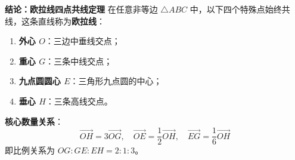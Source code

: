 \begin{statementbox}
\textbf{结论：欧拉线四点共线定理}
在任意非等边 $\triangle ABC$ 中，以下四个特殊点始终共线，这条直线称为\textbf{欧拉线}：
\begin{enumerate}
    \item \textbf{外心 $O$}：三边中垂线交点；
    \item \textbf{重心 $G$}：三条中线交点；
    \item \textbf{九点圆圆心 $E$}：三角形九点圆的中心；
    \item \textbf{垂心 $H$}：三条高线交点。
\end{enumerate}
\textbf{核心数量关系}：
\[ \vec{OH} = 3\vec{OG}, \quad \vec{OE} = \frac{1}{2}\vec{OH}, \quad \vec{EG} = \frac{1}{6}\vec{OH} \]
即比例关系为 $OG : GE : EH = 2 : 1 : 3$。
\end{statementbox}